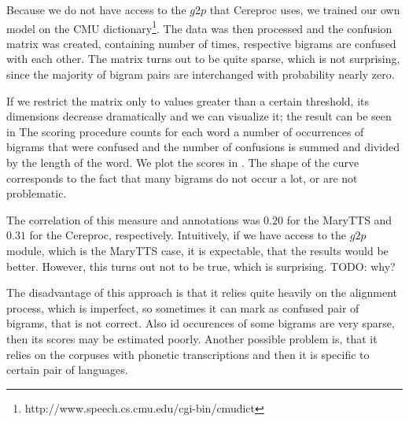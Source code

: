 Because we do not have access to the $g2p$ that Cereproc uses, we trained our own model on the CMU dictionary\footnote{http://www.speech.cs.cmu.edu/cgi-bin/cmudict}.
The data was then processed and the confusion matrix was created, containing number of times, respective bigrams are confused with each other.
The matrix turns out to be quite sparse, which is not surprising, since the majority of bigram pairs are interchanged with probability nearly zero.
\par
If we restrict the matrix only to values greater than a certain threshold, its dimensions decrease dramatically and we can visualize it; the result can be seen in 
The scoring procedure counts for each word a number of occurrences of bigrams that were confused and the number of confusions is summed and divided by the length of the word.
We plot the scores in .
The shape of the curve corresponds to the fact that many bigrams do not occur a lot, or are not problematic.
\par
The correlation of this measure and annotations was $0.20$ for the MaryTTS and $0.31$ for the Cereproc, respectively.
Intuitively, if we have access to the $g2p$ module, which is the MaryTTS case, it is expectable, that the results would be better.
However, this turns out not to be true, which is surprising.
TODO: why?
\par
The disadvantage of this approach is that it relies quite heavily on the alignment process, which is imperfect, so sometimes it can mark as confused pair of bigrams, that is not correct.
Also id occurences of some bigrams are very sparse, then its scores may be estimated poorly.
Another possible problem is, that it relies on the corpuses with phonetic transcriptions and then it is specific to certain pair of languages.
